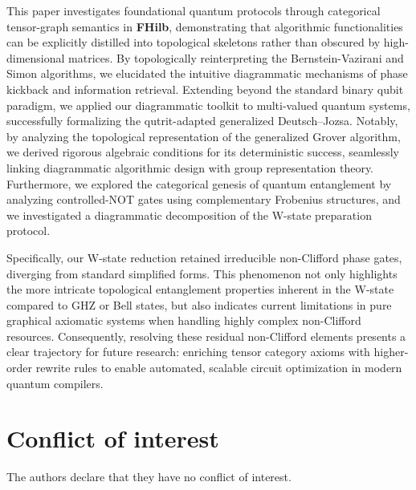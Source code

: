 \documentclass[a4paper,twocolumn,11pt,unpublished]{quantumarticle}
\numberwithin{equation}{section}
\begin{document}
This paper investigates foundational quantum protocols through categorical tensor-graph semantics in \textbf{FHilb}, demonstrating that algorithmic functionalities can be explicitly distilled into topological skeletons rather than obscured by high-dimensional matrices. By topologically reinterpreting the Bernstein-Vazirani and Simon algorithms, we elucidated the intuitive diagrammatic mechanisms of phase kickback and information retrieval. Extending beyond the standard binary qubit paradigm, we applied our diagrammatic toolkit to multi-valued quantum systems, successfully formalizing the qutrit-adapted generalized Deutsch--Jozsa. Notably, by analyzing the topological representation of the generalized Grover algorithm, we derived rigorous algebraic conditions for its deterministic success, seamlessly linking diagrammatic algorithmic design with group representation theory. Furthermore, we explored the categorical genesis of quantum entanglement by analyzing controlled-NOT gates using complementary Frobenius structures, and we investigated a diagrammatic decomposition of the W-state preparation protocol.

Specifically, our W-state reduction retained irreducible non-Clifford phase gates, diverging from standard simplified forms. This phenomenon not only highlights the more intricate topological entanglement properties inherent in the W-state compared to GHZ or Bell states, but also indicates current limitations in pure graphical axiomatic systems when handling highly complex non-Clifford resources. Consequently, resolving these residual non-Clifford elements presents a clear trajectory for future research: enriching tensor category axioms with higher-order rewrite rules to enable automated, scalable circuit optimization in modern quantum compilers.


\section*{\textbf{Conflict of interest}}
	
	The authors declare that they have no conflict of interest.
	
\end{document}

